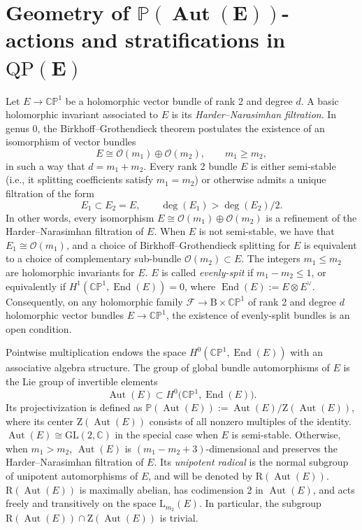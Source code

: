 \documentclass[pdftex]{sigma}
\newcommand{\field}[1]{\ensuremath{\mathbb{#1}}}
\newcommand{\CC}{\field{C}}
\newcommand{\PP}{\field{P}}
\newcommand{\calO}{\mathcal{O}}
\newcommand{\curly}[1]{\mathscr{#1}}
\newcommand{\cF}{\curly{F}}
\DeclareMathOperator{\Aut}{Aut}
\DeclareMathOperator{\End}{End}
\numberwithin{equation}{section}
\begin{document}
\section[Geometry of P(Aut(E))-actions and stratifications in QP(E)]
{Geometry of $\boldsymbol{\PP(\Aut(E))}$-actions and stratifications in $\boldsymbol{\mathrm{QP}(E)}$}\label{sec:ev-data-bundles}

Let $E\rightarrow \CC\PP^{1}$ be a holomorphic vector bundle of rank 2 and degree $d$. A basic holomorphic invariant associated to $E$ is its \textit{Harder--Narasimhan filtration}. In genus 0, the Birkhoff--Grothendieck theorem postulates the existence of an isomorphism of vector bundles
\[
E\cong \calO(m_{1})\oplus\calO(m_{2}),\qquad m_{1}\geq m_{2},
\]
in such a way that $d=m_{1}+m_{2}$. Every rank 2 bundle $E$ is either semi-stable (i.e., it splitting coefficients satisfy $m_{1}=m_{2}$) or otherwise admits a unique filtration of the form
\[
E_{1}\subset E_{2} = E,\qquad \deg(E_{1}) >\deg(E_{2})/2.
\]
In other words, every isomorphism $E\cong \calO(m_{1})\oplus\calO(m_{2})$ is a refinement of the Harder--Nara\-sim\-han filtration of $E$. When $E$ is not semi-stable, we have that $E_{1}\cong \calO(m_{1})$, and a choice of Birkhoff--Grothendieck splitting for $E$ is equivalent to a choice of complementary sub-bundle $\calO(m_{2})\subset E$. The integers $m_{1}\leq m_{2}$ are holomorphic invariants for $E$. $E$ is called \emph{evenly-spit} if $m_{1}-m_{2}\leq 1$, or equivalently if $H^{1}(\CC\PP^{1},\End (E))=0$, where $\End(E):= E\otimes E^{\vee}$. Consequently, on any holomorphic family $\cF\rightarrow \mathrm{B}\times\CC\PP^{1}$ of rank 2 and degree $d$ holomorphic vector bundles $E\rightarrow\CC\PP^{1}$, the existence of evenly-split bundles is an open condition.

Pointwise multiplication endows the space $H^{0}(\CC\PP^{1},\End (E))$ with an associative algebra structure. The group of global bundle automorphisms of $E$ is the Lie group of invertible ele\-ments
\[
\Aut(E)\subset H^{0}\bigl(\CC\PP^{1},\End (E)\bigr).
\]
Its projectivization is defined as $\PP(\Aut (E)):=\Aut(E)/\mathrm{Z}(\Aut(E))$, where its center $\mathrm{Z}(\Aut(E))$ consists of all nonzero multiples of the identity. $\Aut(E)\cong\mathrm{GL}(2,\CC)$ in the special case when $E$ is semi-stable. Otherwise, when $m_{1}>m_{2}$, $\Aut(E)$ is $(m_{1}-m_{2}+3)$-dimensional and preserves the Harder--Narasimhan filtration of $E$. Its \emph{unipotent radical} is the normal subgroup of unipotent automorphisms of $E$, and will be denoted by $\mathrm{R}(\Aut(E))$. $\mathrm{R}(\Aut(E))$ is maximally abelian, has codimension 2 in $\Aut(E)$, and acts freely and transitively on the space $\mathrm{L}_{m_{2}}(E)$. In particular, the subgroup $\mathrm{R}(\Aut(E))\cap \mathrm{Z}(\Aut(E))$ is trivial.
\end{document}
